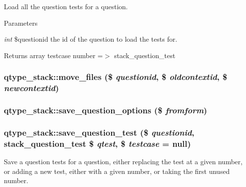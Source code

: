 \label{classqtype__stack_ab8695824b17f6c4f34c79027cfcfb1bf}
Load all the question tests for a question. 
\begin{DoxyParams}{Parameters}
\item[{\em int}]\$questionid the id of the question to load the tests for. \end{DoxyParams}
\begin{DoxyReturn}{Returns}
array testcase number =$>$ stack\_\-question\_\-test 
\end{DoxyReturn}
\hypertarget{classqtype__stack_ab883061ceb86552af7d11117bd733235}{
\subsubsection[{move\_\-files}]{\setlength{\rightskip}{0pt plus 5cm}qtype\_\-stack::move\_\-files (\$ {\em questionid}, \/  \$ {\em oldcontextid}, \/  \$ {\em newcontextid})}}
\label{classqtype__stack_ab883061ceb86552af7d11117bd733235}
\hypertarget{classqtype__stack_aa2952c507edf5a94a04008d3280935c9}{
\subsubsection[{save\_\-question\_\-options}]{\setlength{\rightskip}{0pt plus 5cm}qtype\_\-stack::save\_\-question\_\-options (\$ {\em fromform})}}
\label{classqtype__stack_aa2952c507edf5a94a04008d3280935c9}
\hypertarget{classqtype__stack_a9e5ff46bd0ed0ce2dad68b96b6362cc4}{
\subsubsection[{save\_\-question\_\-test}]{\setlength{\rightskip}{0pt plus 5cm}qtype\_\-stack::save\_\-question\_\-test (\$ {\em questionid}, \/  stack\_\-question\_\-test \$ {\em qtest}, \/  \$ {\em testcase} = {\ttfamily null})}}
\label{classqtype__stack_a9e5ff46bd0ed0ce2dad68b96b6362cc4}
Save a question tests for a question, either replacing the test at a given number, or adding a new test, either with a given number, or taking the first unused number. 
